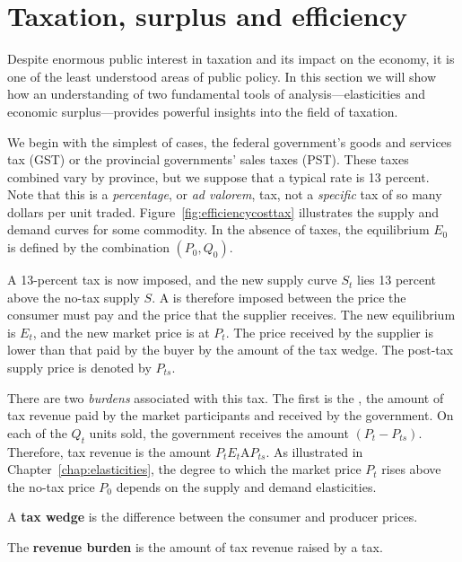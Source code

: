 \section{Taxation, surplus and efficiency} \label{sec:taxsureff}

Despite enormous public interest in taxation and its impact on the economy, it is one of the least understood areas of public policy. In this section we will show how an understanding of two fundamental tools of analysis---elasticities and economic surplus---provides powerful insights into the field of taxation.

We begin with the simplest of cases, the federal government's goods and services tax (GST) or the provincial governments' sales taxes (PST). These taxes combined vary by province, but we suppose that a typical rate is 13 percent. Note that this is a \textit{percentage}, or \textit{ad valorem}, tax, not a \textit{specific} tax of so many dollars per unit traded. Figure~\ref{fig:efficiencycosttax} illustrates the supply and demand curves for some commodity. In the absence of taxes, the equilibrium $E_0$ is defined by the combination $(P_0, Q_0)$.



A 13-percent tax is now imposed, and the new supply curve $S_t$ lies 13 percent above the no-tax supply $S$. A  is therefore imposed between the price the consumer must pay and the price that the supplier receives. The new equilibrium is $E_t$, and the new market price is at $P_t$. The price received by the supplier is lower than that paid by the buyer by the amount of the tax wedge. The post-tax supply price is denoted by $P_{ts}$.

There are two \textit{burdens} associated with this tax. The first is the , the amount of tax revenue paid by the market participants and received by the government. On each of the $Q_t$ units sold, the government receives the amount $(P_t-P_{ts})$. Therefore, tax revenue is the amount $P_tE_t$A$P_{ts}$. As illustrated in Chapter~\ref{chap:elasticities}, the degree to which the market price $P_t$ rises above the no-tax price $P_0$ depends on the supply and demand elasticities.

\begin{DefBox}
A \textbf{tax wedge} is the difference between the consumer and producer prices.

The \textbf{revenue burden} is the amount of tax revenue raised by a tax.
\end{DefBox}

